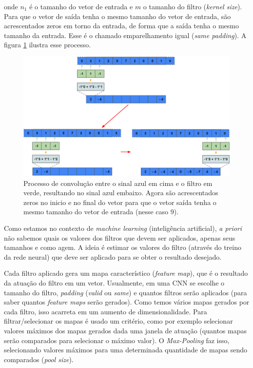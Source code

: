 \documentclass[a4paper,12pt,oneside]{book}
\begin{document}
\par onde $n_1$ é o tamanho do vetor de entrada e $m$ o tamanho do filtro (\textit{kernel size}). Para que o vetor de saída tenha o mesmo tamanho do vetor de entrada, são acrescentados zeros em torno da entrada, de forma que a saída tenha o mesmo tamanho da entrada. Esse é o chamado emparelhamento igual (\textit{same padding}). A figura \ref{fig:conv_same} ilustra esse processo.

\begin{figure}[H]
    \centering
    \includegraphics[scale = 0.38]{figs/conv_same.png}
    \caption{Processo de convolução entre o sinal azul em cima e o filtro em verde, resultando no sinal azul embaixo. Agora são acrescentados zeros no inicio e no final do vetor para que o vetor saída tenha o mesmo tamanho do vetor de entrada (nesse caso 9).}
    \label{fig:conv_same}
\end{figure}
\par Como estamos no contexto de \textit{machine learning} (inteligência artificial), \textit{a priori} não sabemos quais os valores dos filtros que devem ser aplicados, apenas seus tamanhos e como agem. A ideia é estimar os valores do filtro (através do treino da rede neural) que deve ser aplicado para se obter o resultado desejado.

\par Cada filtro aplicado gera um mapa característico (\textit{feature map}), que é o resultado da atuação do filtro em um vetor. Usualmente, em uma CNN se escolhe o tamanho do filtro, \textit{padding} (\textit{valid} ou \textit{same}) e quantos filtros serão aplicados (para saber quantos \textit{feature maps} serão gerados). Como temos vários mapas gerados por cada filtro, isso acarreta em um aumento de dimensionalidade. Para filtrar/selecionar os mapas é usado um critério, como por exemplo selecionar valores máximos dos mapas gerados dada uma janela de atuação (quantos mapas serão comparados para selecionar o máximo valor). O \textit{Max-Pooling} faz isso, selecionando valores máximos para uma determinada quantidade de mapas sendo comparados (\textit{pool size}).
\end{document}

